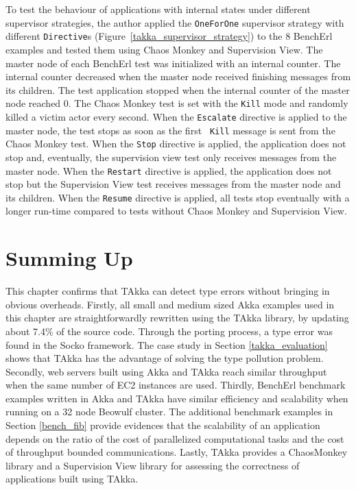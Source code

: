 To test the behaviour of applications with internal states under 
different supervisor strategies, the author applied the {\tt OneForOne} 
supervisor strategy with different {\tt Directive}s (Figure~\ref{takka_supervisor_strategy}) to the 8 BenchErl examples 
and tested them using Chaos Monkey and Supervision View.  The master node of 
each BenchErl test was initialized with an internal counter.  The internal 
counter decreased when the master node received finishing messages from its 
children.  The test application stopped when the internal counter of the master 
node reached 0.  The Chaos Monkey test is set with the {\tt Kill} mode 
and randomly killed a victim actor every second.  When the {\tt Escalate} 
directive is applied to the master node, the test stops as soon as the first {\tt 
Kill} message is sent from the Chaos Monkey test.  When the {\tt Stop} directive 
is applied, the application does not stop and, eventually, the supervision view 
test only receives messages from the master node.  When the {\tt Restart} 
directive is applied, the application does not stop but the Supervision View test 
receives messages from the master node and its children.  When the {\tt Resume} 
directive is applied, all tests stop eventually with a longer run-time compared to 
tests without Chaos Monkey and Supervision View.

\section{Summing Up}

This chapter confirms that TAkka can detect type errors without bringing in 
obvious overheads.  Firstly, all small and medium sized Akka examples used in 
this chapter are straightforwardly rewritten using the TAkka library, by 
updating about 7.4\% of the source code.  Through the porting process, a type 
error was found in the Socko framework.  The case study in Section 
\ref{takka_evaluation} shows that TAkka has the 
advantage of solving the type pollution problem.  Secondly, web 
servers built using Akka and TAkka reach similar throughput when the same 
number of EC2 instances are used.  Thirdly, BenchErl benchmark examples written 
in Akka and TAkka have similar efficiency and scalability when running on a 
32 node Beowulf cluster.  The additional benchmark examples in Section 
\ref{bench_fib} provide evidences that the scalability of an application 
depends on the ratio of the cost of parallelized computational tasks and the 
cost of throughput bounded communications.  Lastly, TAkka provides a ChaosMonkey 
library and a Supervision View library for assessing the correctness of 
applications built using TAkka. 


